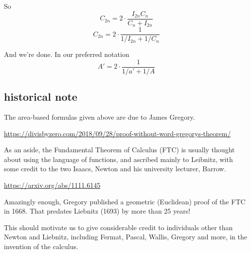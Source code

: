 \documentclass[11pt, oneside]{article}
\begin{document}
So
\[ C_{2n}  = 2 \cdot \frac{I_{2n} C_n} {C_{n} + I_{2n}}  \]
\[ C_{2n} = 2 \cdot \frac{1}{1/I_{2n} + 1/C_n} \]

And we're done.  In our preferred notation
\[ A' = 2 \cdot \frac{1}{1/a' + 1/A} \]

\subsection*{historical note}

The area-based formulas given above are due to James Gregory.

\url{https://divisbyzero.com/2018/09/28/proof-without-word-gregorys-theorem/}

As an aside, the Fundamental Theorem of Calculus (FTC) is usually thought about using the language of functions, and ascribed mainly to Leibnitz, with some credit to the two Isaacs, Newton and his university lecturer, Barrow.

\url{https://arxiv.org/abs/1111.6145}

Amazingly enough, Gregory published a geometric (Euclidean) proof of the FTC in 1668.  That predates Liebnitz (1693) by more than 25 years!  

This should motivate us to give considerable credit to individuals other than Newton and Liebnitz, including Fermat, Pascal, Wallis, Gregory and more, in the invention of the calculus.
\end{document}
